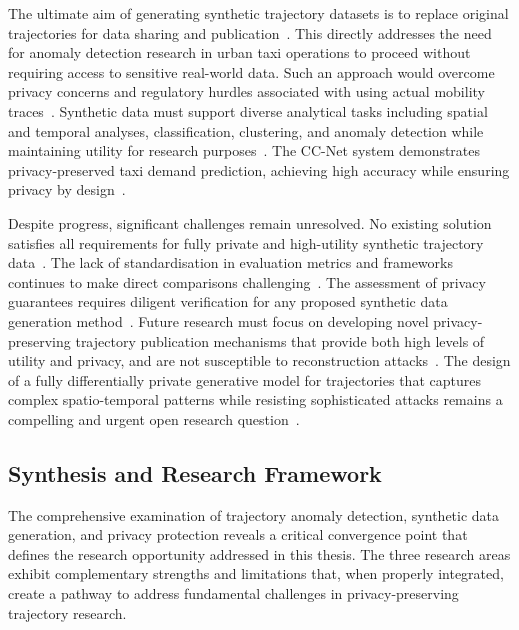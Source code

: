 \documentclass[runningheads]{llncs}
\begin{document}
The ultimate aim of generating synthetic trajectory datasets is to replace original trajectories for data sharing and publication~\cite{Buchholz2024SoK,Rao2021LSTMTrajGAN,Liu2018TrajGANs}. This directly addresses the need for anomaly detection research in urban taxi operations to proceed without requiring access to sensitive real-world data. Such an approach would overcome privacy concerns and regulatory hurdles associated with using actual mobility traces~\cite{Buchholz2024SoK,Rao2021LSTMTrajGAN,Liu2018TrajGANs}. Synthetic data must support diverse analytical tasks including spatial and temporal analyses, classification, clustering, and anomaly detection while maintaining utility for research purposes~\cite{Rao2021LSTMTrajGAN,Chen2011DPTP}. The CC-Net system demonstrates privacy-preserved taxi demand prediction, achieving high accuracy while ensuring privacy by design~\cite{Ozeki2023PPTP}.

Despite progress, significant challenges remain unresolved. No existing solution satisfies all requirements for fully private and high-utility synthetic trajectory data~\cite{Buchholz2024SoK}. The lack of standardisation in evaluation metrics and frameworks continues to make direct comparisons challenging~\cite{Primault2019LongRoad,Jin2023SurveyExpStudy}. The assessment of privacy guarantees requires diligent verification for any proposed synthetic data generation method~\cite{Buchholz2024SoK}. Future research must focus on developing novel privacy-preserving trajectory publication mechanisms that provide both high levels of utility and privacy, and are not susceptible to reconstruction attacks~\cite{Buchholz2022RAoPT,Buchholz2024SoK,Primault2019LongRoad}. The design of a fully differentially private generative model for trajectories that captures complex spatio-temporal patterns while resisting sophisticated attacks remains a compelling and urgent open research question~\cite{Buchholz2024SoK,Buchholz2022RAoPT}.

\subsection{Synthesis and Research Framework}
\label{sec:synthesis}

The comprehensive examination of trajectory anomaly detection, synthetic data generation, and privacy protection reveals a critical convergence point that defines the research opportunity addressed in this thesis. The three research areas exhibit complementary strengths and limitations that, when properly integrated, create a pathway to address fundamental challenges in privacy-preserving trajectory research.
\end{document}
